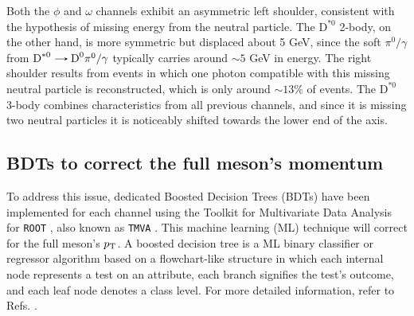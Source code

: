 Both the $\phi$ and $\omega$ channels exhibit an asymmetric left shoulder, consistent with the hypothesis of missing energy from the neutral particle. The $\text{D}^{*0}$ 2-body, on the other hand, is more symmetric but displaced about 5 GeV, since the soft $\pi^{0}/\gamma$ from $\text{D}^{*0}\decaysto \text{D}^{0}\pi^{0}/\gamma$ typically carries around $\sim5$ GeV in energy. The right shoulder results from events in which one photon compatible with this missing neutral particle is reconstructed, which is only around $\sim 13\%$ of events. The $\text{D}^{*0}$ 3-body combines characteristics from all previous channels, and since it is missing two neutral particles it is noticeably shifted towards the lower end of the axis.

\subsection{\r BDTs to correct the full meson's momentum}

To address this issue, dedicated Boosted Decision Trees (BDTs) have been implemented for each channel using the Toolkit for Multivariate Data Analysis for \verb+ROOT+ \cite{CERN:root}, also known as \verb+TMVA+ \cite{TMVA:2007ngy}. This machine learning (ML) technique will correct for the full meson's $p_\text{T}$. A boosted decision tree is a ML binary classifier or regressor algorithm based on a flowchart-like structure in which each internal node represents a test on an attribute, each branch signifies the test's outcome, and each leaf node denotes a class level. For more detailed information, refer to Refs. \cite{TMVA:2007ngy, Coadou:2022nsh}.

